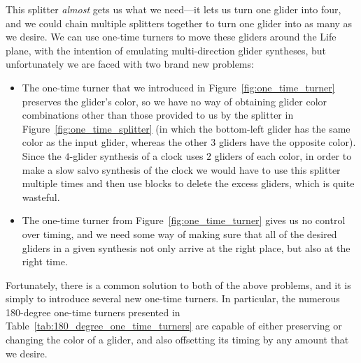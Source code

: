 This splitter \emph{almost} gets us what we need---it lets us turn one glider into four, and we could chain multiple splitters together to turn one glider into as many as we desire. We can use one-time turners to move these gliders around the Life plane, with the intention of emulating multi-direction glider syntheses, but unfortunately we are faced with two brand new problems:\smallskip

\begin{itemize}
	\item The one-time turner that we introduced in Figure~\ref{fig:one_time_turner} preserves the glider's color, so we have no way of obtaining glider color combinations other than those provided to us by the splitter in Figure~\ref{fig:one_time_splitter} (in which the bottom-left glider has the same color as the input glider, whereas the other $3$ gliders have the opposite color). Since the $4$-glider synthesis of a clock uses $2$ gliders of each color, in order to make a slow salvo synthesis of the clock we would have to use this splitter multiple times and then use blocks to delete the excess gliders, which is quite wasteful.\smallskip
	
	\item The one-time turner from Figure~\ref{fig:one_time_turner} gives us no control over timing, and we need some way of making sure that all of the desired gliders in a given synthesis not only arrive at the right place, but also at the right time.\smallskip
\end{itemize}

Fortunately, there is a common solution to both of the above problems, and it is simply to introduce several new one-time turners. In particular, the numerous 180-degree one-time turners presented in Table~\ref{tab:180_degree_one_time_turners} are capable of either preserving or changing the color of a glider, and also offsetting its timing by any amount that we desire.%


